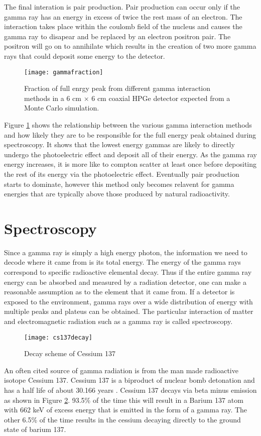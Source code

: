 The final interation is pair production.
Pair production can occur only if the gamma ray has an energy in excess of twice the rest mass of an electron.
The interaction takes place within the coulomb field of the nucleus and causes the gamma ray to disapear and be replaced by an electron positron pair.
The positron will go on to annihilate which results in the creation of two more gamma rays that could deposit some energy to the detector.
\begin{figure}[htpb]
\centering
\texttt{[image: gammafraction]}
  \caption{Fraction of full enrgy peak from different gamma interaction methods in a 6 cm $\times$ 6 cm coaxial HPGe detector expected from a Monte Carlo simulation. \cite{Roth1984SegmentationAP}}
\label{fig:gammafraction}
\end{figure}
Figure \ref{fig:gammafraction} shows the relationship between the various gamma interaction methods and how likely they are to be responsible for the full energy peak obtained during spectroscopy.
It shows that the lowest energy gammas are likely to directly undergo the photoelectric effect and deposit all of their energy.
As the gamma ray energy increases, it is more like to compton scatter at least once before depositing the rest of its energy via the photoelectric effect.
Eventually pair production starts to dominate, however this method only becomes relavent for gamma energies that are typically above those produced by natural radioactivity.

\section{Spectroscopy}
Since a gamma ray is simply a high energy photon, the information we need to decode where it came from is its total energy.
The energy of the gamma rays correspond to specific radioactive elemental decay.
Thus if the entire gamma ray energy can be absorbed and measured by a radiation detector, one can make a reasonable assumption as to the element that it came from.
If a detector is exposed to the environment, gamma rays over a wide distribution of energy with multiple peaks and plateus can be obtained.
The particular interaction of matter and electromagnetic radiation such as a gamma ray is called spectroscopy.

\begin{figure}[htpb]
\centering
\texttt{[image: cs137decay]}
\caption{Decay scheme of Cessium 137}
\label{fig:cs137decay}
\end{figure}
An often cited source of gamma radiation is from the man made radioactive isotope Cessium 137.
Cessium 137 is a biproduct of nuclear bomb detonation and has a half life of about 30.166 years \cite{1992NIMPA}.
Cessium 137 decays via beta minus emission as shown in Figure \ref{fig:cs137decay}.
93.5\% of the time this will result in a Barium 137 atom with 662 keV of excess energy that is emitted in the form of a gamma ray.
The other 6.5\% of the time results in the cessium decaying directly to the ground state of barium 137.

